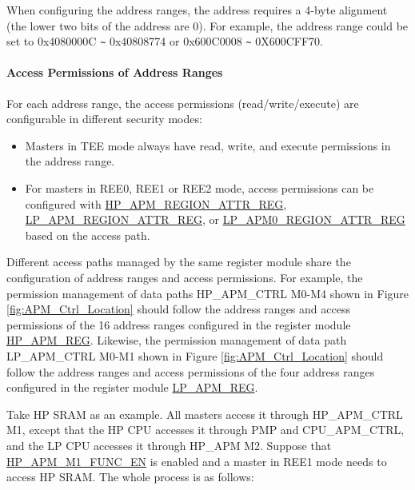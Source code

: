 \documentclass[main\_\_EN.tex]{subfiles}
\begin{document}
When configuring the address ranges, the address requires a 4-byte alignment (the lower two bits of the address are 0). For example, the address range could be set to 0x4080000C \verb+~+ 0x40808774 or 0x600C0008 \verb+~+ 0X600CFF70.

\paragraph{Access Permissions of Address Ranges}

For each address range, the access permissions (read/write/execute) are configurable in different security modes:

\begin{itemize}

    \item Masters in TEE mode always have read, write, and execute permissions in the address range.

    \item For masters in REE0, REE1 or REE2 mode, access permissions can be configured with \hyperref[regdesc:HPAPMREGIONNATTRREG]{HP\_APM\_REGION\_ATTR\_REG}, \hyperref[regdesc:LPAPMREGIONNATTRREG]{LP\_APM\_REGION\_ATTR\_REG}, or \hyperref[regdesc:LPAPM0REGIONNATTRREG]{LP\_APM0\_REGION\_ATTR\_REG} based on the access path.

\end{itemize}

Different access paths managed by the same register module share the configuration of address ranges and access permissions. For example, the permission management of data paths HP\_APM\_CTRL M0-M4 shown in Figure \ref{fig:APM_Ctrl_Location} should follow the address ranges and access permissions of the 16 address ranges configured in the register module \hyperref[sec:permctrl-reg-hp]{HP\_APM\_REG}. Likewise, the permission management of data path LP\_APM\_CTRL M0-M1 shown in Figure \ref{fig:APM_Ctrl_Location} should follow the address ranges and access permissions of the four address ranges configured in the register module \hyperref[sec:permctrl-reg-lp]{LP\_APM\_REG}.

Take HP SRAM as an example. All masters access it through HP\_APM\_CTRL M1, except that the HP CPU accesses it through PMP and CPU\_APM\_CTRL, and the LP CPU accesses it through HP\_APM M2. Suppose that \hyperref[fielddesc:HPAPMM1FUNCEN]{HP\_APM\_M1\_FUNC\_EN} is enabled and a master in REE1 mode needs to access HP SRAM. The whole process is as follows:
\end{document}
